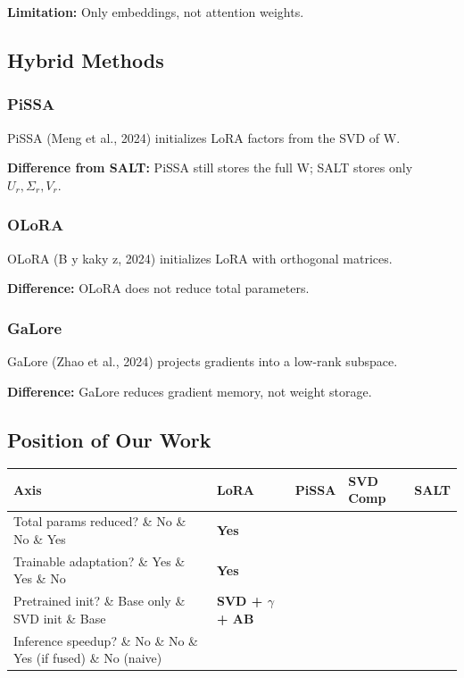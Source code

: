 \textbf{Limitation:} Only embeddings, not attention weights.

\subsection{Hybrid Methods}

\subsubsection{PiSSA}

PiSSA (Meng et al., 2024) initializes LoRA factors from the SVD of W.

\textbf{Difference from SALT:} PiSSA still stores the full W; SALT stores only 
$U_r, \Sigma_r, V_r$.

\subsubsection{OLoRA}

OLoRA (B y kaky z, 2024) initializes LoRA with orthogonal matrices.

\textbf{Difference:} OLoRA does not reduce total parameters.

\subsubsection{GaLore}

GaLore (Zhao et al., 2024) projects gradients into a low-rank subspace.

\textbf{Difference:} GaLore reduces gradient memory, not weight storage.

\subsection{Position of Our Work}

\begin{table}[H]
\centering
\small
\begin{tabular}{lllll}
\toprule
\textbf{Axis} & \textbf{LoRA} & \textbf{PiSSA} & \textbf{SVD Comp} & \textbf{SALT} \\
\midrule
Total params reduced? \& No \& No \& Yes & \textbf{Yes} \\
Trainable adaptation? \& Yes \& Yes \& No & \textbf{Yes} \\
Pretrained init? \& Base only \& SVD init \& Base & \textbf{SVD + $\gamma$ + AB} \\
Inference speedup? \& No \& No \& Yes (if fused) \& No (naive) \\
\bottomrule
\end{tabular}
\end{table}

